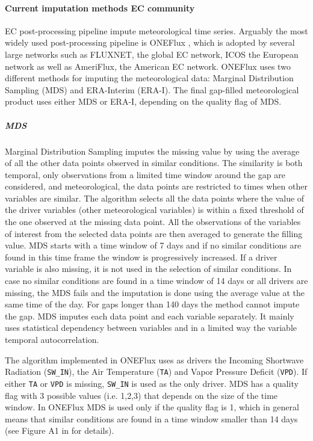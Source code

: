 \documentclass{article}
\begin{document}
\paragraph{Current imputation methods EC community} EC post-processing pipeline impute meteorological time series. Arguably the most widely used post-processing pipeline is \textsf{ONEFlux} \cite{pastorello_fluxnet2015_2020}, which is adopted by several large networks such as FLUXNET, the global EC network, ICOS the European network as well as AmeriFlux, the American EC network.
\textsf{ONEFlux} uses two different methods for imputing the meteorological data: Marginal Distribution Sampling (MDS) and ERA-Interim (ERA-I). The final gap-filled meteorological product uses either MDS or ERA-I, depending on the quality flag of MDS.
\subparagraph{MDS} Marginal Distribution Sampling \cite{reichstein_separation_2005-3} imputes the missing value by using the average of all the other data points observed in similar conditions. The similarity is both temporal, only observations from a limited time window around the gap are considered, and meteorological, the data points are restricted to times when other variables are similar. 
The algorithm selects all the data points where the value of the driver variables (other meteorological variables) is within a fixed threshold of the one observed at the missing data point. All the observations of the variables of interest from the selected data points are then averaged to generate the filling value. MDS starts with a time window of 7 days and if no similar conditions are found in this time frame the window is progressively increased. If a driver variable is also missing, it is not used in the selection of similar conditions. 
In case no similar conditions are found in a time window of 14 days or all drivers are missing, the MDS fails and the imputation is done using the average value at the same time of the day. For gaps longer than 140 days the method cannot impute the gap.
MDS imputes each data point and each variable separately. It mainly uses statistical dependency between variables and in a limited way the variable temporal autocorrelation. 

The algorithm implemented in \textsf{ONEFlux} uses as drivers the Incoming Shortwave Radiation (\texttt{SW\_IN}), the Air Temperature (\texttt{TA}) and Vapor Pressure Deficit (\texttt{VPD}). If either \texttt{TA} or \texttt{VPD} is missing, \texttt{SW\_IN} is used as the only driver. 
MDS has a quality flag with 3 possible values (i.e. 1,2,3) that depends on the size of the time window. In \textsf{ONEFlux} MDS is used only if the quality flag is 1, which in general means that similar conditions are found in a time window smaller than 14 days (see Figure A1 in \textcite{reichstein_separation_2005-3} for details). 
\end{document}
